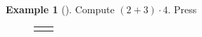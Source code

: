 \documentclass[10pt,]{book}
\theoremstyle{plain}
\theoremstyle{definition}
\theoremstyle{definition}
\newtheorem{example}[theorem]{Example}
\theoremstyle{definition}
\numberwithin{equation}{part}
\newlength{\panelmax}
\begin{document}
\begin{example}[]\label{example-97}
Compute \((2+3)\cdot4\). Press%
{%
\setlength{\panelmax}{0pt}
\newsavebox{\panelboxAHXp}
\newlength{\phAHXp}\setlength{\phAHXp}{\ht\panelboxAHXp+\dp\panelboxAHXp}
\settototalheight{\phAHXp}{\usebox{\panelboxAHXp}}
\setlength{\panelmax}{\maxof{\panelmax}{\phAHXp}}
\newsavebox{\panelboxAHYp}
\newlength{\phAHYp}\setlength{\phAHYp}{\ht\panelboxAHYp+\dp\panelboxAHYp}
\settototalheight{\phAHYp}{\usebox{\panelboxAHYp}}
\setlength{\panelmax}{\maxof{\panelmax}{\phAHYp}}
\leavevmode%
\setlength{\tabcolsep}{0.025\textwidth}
\begin{figure}
\begin{tabular}{@{}*{2}{c}@{}}
\begin{minipage}[c][\panelmax][t]{0.6\textwidth}\usebox{\panelboxAHXp}\end{minipage}&
\begin{minipage}[c][\panelmax][t]{0.35\textwidth}\usebox{\panelboxAHYp}\end{minipage}\end{tabular}
\end{figure}
}%
\end{example}
\end{document}
